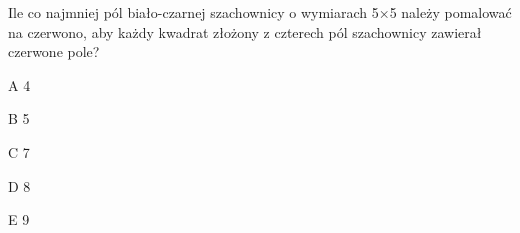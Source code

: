 \begin{tresc}
Ile co najmniej pól biało-czarnej szachownicy o wymiarach 5×5 należy pomalować na czerwono, aby każdy kwadrat złożony z czterech pól szachownicy zawierał czerwone pole?
\end{tresc}
\begin{wariant}{A} 4 \end{wariant}
\begin{wariant}{B} 5 \end{wariant}
\begin{wariant}{C} 7 \end{wariant}
\begin{wariant}{D} 8 \end{wariant}
\begin{wariant}{E} 9 \end{wariant}
